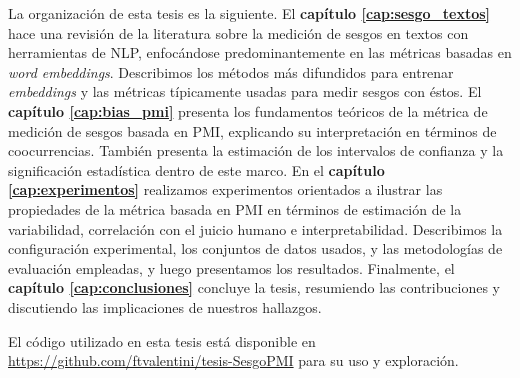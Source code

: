 La organización de esta tesis es la siguiente. El \textbf{capítulo \ref{cap:sesgo_textos}} hace una revisión de la literatura sobre la medición de sesgos en textos con herramientas de NLP, enfocándose predominantemente en las métricas basadas en \emph{word embeddings}. Describimos los métodos más difundidos para entrenar \emph{embeddings} y las métricas típicamente usadas para medir sesgos con éstos. El \textbf{capítulo \ref{cap:bias_pmi}} presenta los fundamentos teóricos de la métrica de medición de sesgos basada en PMI, explicando su interpretación en términos de coocurrencias. También presenta la estimación de los intervalos de confianza y la significación estadística dentro de este marco. En el \textbf{capítulo \ref{cap:experimentos}} realizamos experimentos orientados a ilustrar las propiedades de la métrica basada en PMI en términos de estimación de la variabilidad, correlación con el juicio humano e interpretabilidad. Describimos la configuración experimental, los conjuntos de datos usados, y las metodologías de evaluación empleadas, y luego presentamos los resultados. Finalmente, el \textbf{capítulo \ref{cap:conclusiones}} concluye la tesis, resumiendo las contribuciones y discutiendo las implicaciones de nuestros hallazgos.
 
El código utilizado en esta tesis está disponible en \url{https://github.com/ftvalentini/tesis-SesgoPMI} para su uso y exploración.



